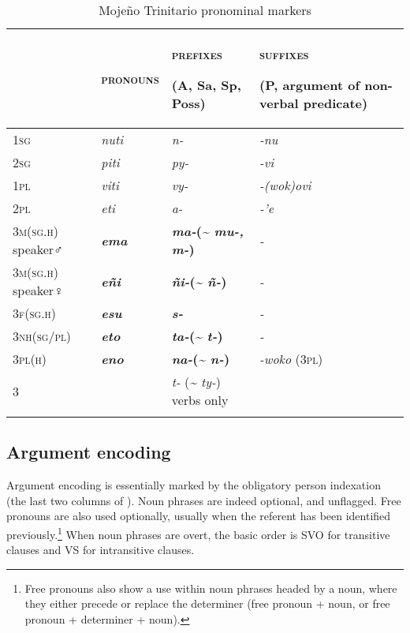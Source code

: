 \documentclass[output=paper]{langscibook}
\begin{document}
\begin{table}
\caption{\label{tab:Rose:1}Mojeño Trinitario pronominal markers}
\begin{tabularx}{\textwidth}{p{2.3cm}p{2.5cm}p{3cm}p{3.5cm}}
\lsptoprule
& \textsc{pronouns} & \textsc{prefixes}

(A, Sa, Sp, Poss) & \textsc{suffixes}

\textsc{(P,} \small argument of non-verbal predicate)\\
\hline
1\textsc{sg} & \textit{nuti} & \textit{n-} & \textit{-nu}\\
2\textsc{sg} & \textit{piti} & \textit{py-} & \textit{-vi}\\
1\textsc{pl} & \textit{viti} & \textit{vy-} & \textit{-(wok)ovi}\\
2\textsc{pl} & \textit{eti} & \textit{a-} & \textit{-'e}\\
3\textsc{m(sg.h)} speaker♂ & {\bfseries \textmd{\textit{ema}}} & {\bfseries \textmd{\textit{ma-}}\textmd{}\textmd{(}\textmd{\textit{{\textasciitilde} mu-, m-}}\textmd{)}} & \textit{-}\\
3\textsc{m(sg.h)} speaker♀ & {\bfseries \textmd{\textit{eñi}}} & {\bfseries \textmd{\textit{ñi-}}\textmd{}\textmd{(}\textmd{\textit{{\textasciitilde} ñ-}}\textmd{)}} & \textit{-}\\
3\textsc{f(sg.h)} & {\bfseries \textmd{\textit{esu}}} & {\bfseries \textmd{\textit{s-}}} & \textit{-}\\
3\textsc{nh(sg/pl)} & {\bfseries \textmd{\textit{eto}}} & {\bfseries \textmd{\textit{ta-}}\textmd{}\textmd{(}\textmd{\textit{{\textasciitilde} t-}}\textmd{)}} & \textit{-}\\
3\textsc{pl(h)} & {\bfseries \textmd{\textit{eno}}} & {\bfseries \textmd{\textit{na-}}\textmd{}\textmd{(}\textmd{\textit{{\textasciitilde} n-}}\textmd{)}} & \textit{-woko} (3\textsc{pl})\\
3 & & \textit{t-} (\textit{{\textasciitilde} ty-}) verbs only & \\
\lspbottomrule
\end{tabularx}
\end{table}

\subsection{Argument encoding}
\label{sec:Rose:2.3}

Argument encoding is essentially marked by the obligatory person indexation (the last two columns of ). Noun phrases are indeed optional, and unflagged. Free pronouns are also used optionally, usually when the referent has been identified previously.\footnote{Free pronouns also show a use within noun phrases headed by a noun, where they either precede or replace the determiner (free pronoun + noun, or free pronoun + determiner + noun).} When noun phrases are overt, the basic order is SVO for transitive clauses and VS for intransitive clauses.
\end{document}
